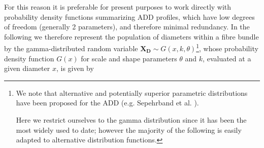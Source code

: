 For this reason it is preferable for present purposes to work directly with probability density functions summarizing ADD profiles, which have low degrees of freedom (generally 2 parameters), and therefore minimal redundancy. In the following we therefore represent the population of diameters within a fibre bundle by the gamma-distributed random variable $\mathbf{X_D} \sim G(x,k,\theta)

$\footnote{We note that alternative and potentially superior parametric distributions have been proposed for the ADD (e.g. Sepehrband et al. \cite{sepehrband2016parametric}). 


Here we restrict ourselves to the gamma distribution since it has been the most widely used to date; however the majority of the following is easily adapted to alternative distribution functions.}, whose probability density function $G(x)$ for scale and shape parameters $\theta$ and $k$, evaluated at a given diameter $x$, is given by 